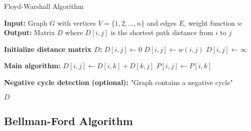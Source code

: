 \documentclass{article}
\theoremstyle{definition}
\begin{document}
\begin{algorithm}
\caption{Floyd-Warshall Algorithm}
\begin{algorithmic}[1]
    \State \textbf{Input:} Graph $G$ with vertices $V = \{1, 2, \ldots, n\}$ and edges $E$, weight function $w$
    \State \textbf{Output:} Matrix $D$ where $D[i,j]$ is the shortest path distance from $i$ to $j$
    
    \State \textbf{Initialize distance matrix $D$:}
                \State $D[i,j] \gets 0$
                \State $D[i,j] \gets w(i,j)$
            \Else
                \State $D[i,j] \gets \infty$
            \EndIf
        \EndFor
    \EndFor
    
    \State \textbf{Main algorithm:}
                    \State $D[i,j] \gets D[i,k] + D[k,j]$
                    \State $P[i,j] \gets P[i,k]$ 
                \EndIf
            \EndFor
        \EndFor
    \EndFor
    
    \State \textbf{Negative cycle detection (optional):}
            \State \Return "Graph contains a negative cycle"
        \EndIf
    \EndFor
    
    \State \Return $D$ 
\EndProcedure
\end{algorithmic}
\end{algorithm}






\pagebreak
\newpage

\subsection{Bellman-Ford Algorithm}
\end{document}
